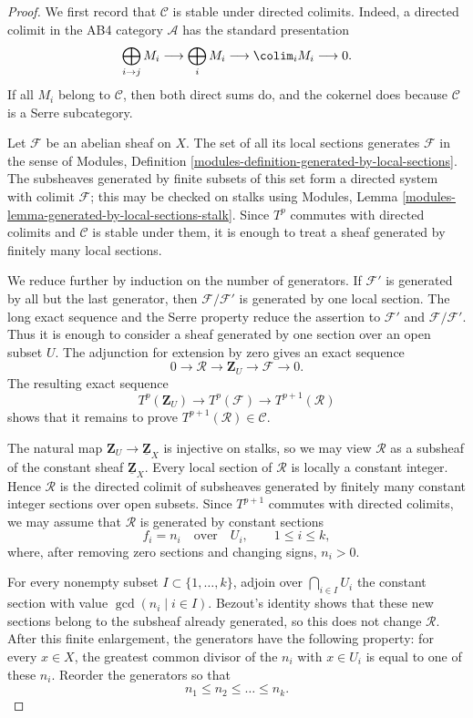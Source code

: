 \begin{proof}
We first record that $\mathcal{C}$ is stable under directed colimits.
Indeed, a directed colimit in the AB4 category $\mathcal{A}$ has the
standard presentation
$$
\bigoplus_{i\to j} M_i\longrightarrow
\bigoplus_i M_i\longrightarrow \colim_i M_i\longrightarrow 0.
$$
If all $M_i$ belong to $\mathcal{C}$, then both direct sums do, and the
cokernel does because $\mathcal{C}$ is a Serre subcategory.

Let $\mathcal{F}$ be an abelian sheaf on $X$. The set of all its local
sections generates $\mathcal{F}$ in the sense of Modules, Definition
\ref{modules-definition-generated-by-local-sections}. The subsheaves
generated by finite subsets of this set form a directed system with colimit
$\mathcal{F}$; this may be checked on stalks using Modules, Lemma
\ref{modules-lemma-generated-by-local-sections-stalk}. Since $T^p$ commutes
with directed colimits and $\mathcal{C}$ is stable under them, it is enough
to treat a sheaf generated by finitely many local sections.

We reduce further by induction on the number of generators. If
$\mathcal{F}'$ is generated by all but the last generator, then
$\mathcal{F}/\mathcal{F}'$ is generated by one local section. The long
exact sequence and the Serre property reduce the
assertion to $\mathcal{F}'$ and $\mathcal{F}/\mathcal{F}'$. Thus it is
enough to consider a sheaf generated by one section over an open subset
$U$. The adjunction for extension by zero gives an exact sequence
$$
0\longrightarrow\mathcal{R}\longrightarrow\mathbf{Z}_U
\longrightarrow\mathcal{F}\longrightarrow 0.
$$
The resulting exact sequence
$$
T^p(\mathbf{Z}_U)\longrightarrow T^p(\mathcal{F})
\longrightarrow T^{p+1}(\mathcal{R})
$$
shows that it remains to prove
$T^{p+1}(\mathcal{R})\in\mathcal{C}$.

The natural map $\mathbf{Z}_U\to\underline{\mathbf{Z}}_X$ is injective
on stalks, so we may view $\mathcal{R}$ as a subsheaf of the constant
sheaf $\underline{\mathbf{Z}}_X$. Every local section of $\mathcal{R}$
is locally a constant integer. Hence $\mathcal{R}$ is the directed colimit
of subsheaves generated by finitely many constant integer sections over
open subsets. Since $T^{p+1}$ commutes with directed colimits, we may assume
that $\mathcal{R}$ is generated by constant sections
$$
f_i=n_i\quad\text{over}\quad U_i,\qquad 1\leq i\leq k,
$$
where, after removing zero sections and changing signs, $n_i>0$.

For every nonempty subset $I\subset\{1,\ldots,k\}$, adjoin over
$\bigcap_{i\in I}U_i$ the constant section with value
$\gcd(n_i\mid i\in I)$. Bezout's identity shows that these new sections
belong to the subsheaf already generated, so this does not change
$\mathcal{R}$. After this finite enlargement, the generators have the
following property: for every $x\in X$, the greatest common divisor of the
$n_i$ with $x\in U_i$ is equal to one of these $n_i$. Reorder the generators
so that
$$
n_1\leq n_2\leq\ldots\leq n_k.
$$


\end{proof}

